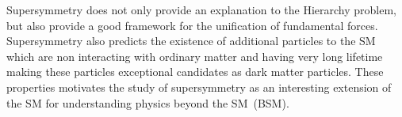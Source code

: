 Supersymmetry does not only provide an explanation to the Hierarchy problem, but also provide a good framework for
the unification of fundamental forces. Supersymmetry also predicts the existence of additional particles to the SM which are
non interacting with ordinary matter and having very long lifetime making these particles exceptional candidates as dark matter
particles. These properties motivates the study of supersymmetry as an interesting extension of the SM for understanding
physics beyond the SM~(BSM).
